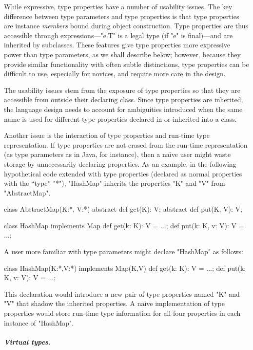 While expressive,
type properties have a number of usability issues.
The key difference between type parameters and type properties
is that type properties are
instance \emph{members} bound during object construction.  Type
properties are thus accessible through expressions---\xcd"e.T" is
a legal type (if \xcd"e" is final)---and are inherited by subclasses.
These features give type properties more expressive power than
type parameters, as we shall describe below; however, because they 
provide similar functionality with often subtle distinctions,
type properties can be difficult to use, especially for novices,
and require more care in the design.

The usability issues stem from the exposure of type properties
so that they are accessible from outside their declaring class.
Since type properties are inherited,
the language design needs
to account for ambiguities introduced when the same name is
used for different type properties declared in or inherited into a class.

Another issue is the interaction of type properties and run-time
type representation.  If type properties are not erased from
the run-time representation (as
type parameters as in Java, for instance), then a na{\"\i}ve user
might waste storage by unnecessarily declaring properties.
As an example, in the following hypothetical code extended with
type properties (declared as normal properties with the ``type''
\xcd"*"),
\xcd"HashMap"  inherits the properties \xcd"K" and \xcd"V" from
\xcd"AbstractMap".
\begin{xten}
class AbstractMap(K:*, V:*) {
  abstract def get(K): V;
  abstract def put(K, V): V;
}

class HashMap implements Map {
  def get(k: K): V = ...;
  def put(k: K, v: V): V = ...;
}
\end{xten}
A user more familiar with type parameters might declare
\xcd"HashMap" as follows:
\begin{xten}
class HashMap(K:*,V:*) implements Map(K,V) {
  def get(k: K): V = ...;
  def put(k: K, v: V): V = ...;
}
\end{xten}
This declaration would introduce a new pair of type properties
named \xcd"K" and
\xcd"V" that shadow the inherited properties.
A na{\"\i}ve implementation of type properties would store run-time
type information for all four properties in each instance
of \xcd"HashMap".

\paragraph{\normalfont\bf\em Virtual types.}

